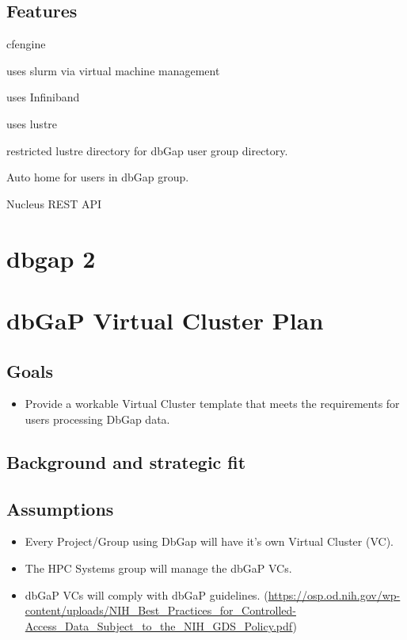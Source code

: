 \subsection{Features}

cfengine

uses slurm via virtual machine management

uses Infiniband

uses lustre

restricted lustre directory for dbGap user group directory.

Auto home for users in dbGap group.

Nucleus REST API


\section{dbgap 2}

\hypertarget{dbgap-virtual-cluster-plan}{%
\section{dbGaP Virtual Cluster Plan}\label{dbgap-virtual-cluster-plan}}


\subsection{Goals}

\begin{itemize}
\item
  Provide a workable Virtual Cluster template that meets the
  requirements for users processing DbGap data.
\end{itemize}

\hypertarget{background-and-strategic-fit}{%
\subsection{Background and strategic
fit}\label{background-and-strategic-fit}}

\hypertarget{assumptions}{%
\subsection{Assumptions}\label{assumptions}}

\begin{itemize}
\item
  Every Project/Group using DbGap will have it's own Virtual Cluster
  (VC).
\item
  The HPC Systems group will manage the dbGaP VCs.
\item
  dbGaP VCs will comply with dbGaP guidelines.
  (\url{https://osp.od.nih.gov/wp-content/uploads/NIH_Best_Practices_for_Controlled-Access_Data_Subject_to_the_NIH_GDS_Policy.pdf})
\end{itemize}



